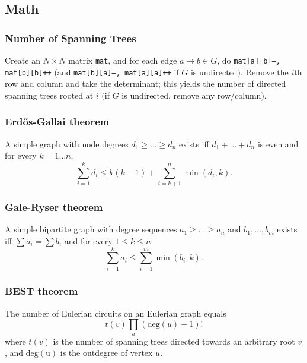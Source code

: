 \subsection{Math}
  \subsubsection{Number of Spanning Trees}
    Create an $N\times N$ matrix \texttt{mat}, and for each edge $a \rightarrow b \in G$, do
    \texttt{mat[a][b]--, mat[b][b]++} (and \texttt{mat[b][a]--, mat[a][a]++} if $G$ is undirected).
    Remove the $i$th row and column and take the determinant; this yields the number of directed spanning trees rooted at $i$
    (if $G$ is undirected, remove any row/column).

  \subsubsection{Erdős-Gallai theorem}
    A simple graph with node degrees $d_1 \ge \dots \ge d_n$ exists iff $d_1 + \dots + d_n$ is even and for every $k = 1\dots n$,
    \[ \sum _{i=1}^{k}d_{i}\leq k(k-1)+\sum _{i=k+1}^{n}\min(d_{i},k). \]

  \subsubsection{Gale-Ryser theorem}
    A simple bipartite graph with degree sequences $a_1 \geq \dots \geq a_n$
    and $b_1, \dots, b_m$ exists iff $\sum a_i = \sum b_i$ and for every
    $1 \leq k \leq n$
    \[ \sum_{i=1}^k a_i \leq \sum_{i=1}^m \min(b_i, k). \]

  \subsubsection{BEST theorem}
    The number of Eulerian circuits on an Eulerian graph equals
    \[ t(v) \prod_{u} (\mathrm{deg}(u) - 1)! \]
    where $t(v)$ is the number of spanning trees directed towards an arbitrary root $v$,
    and $\mathrm{deg(u)}$ is the outdegree of vertex $u$.

